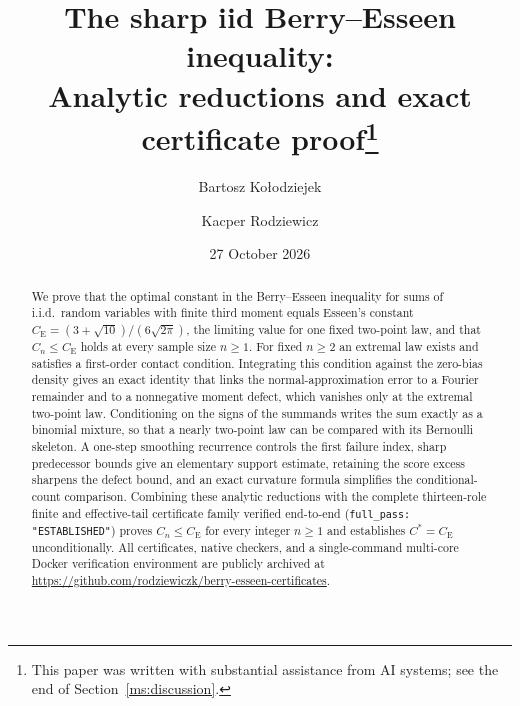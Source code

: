 \documentclass[11pt,a4paper]{article}
\title{The sharp iid Berry--Esseen inequality:\\
Analytic reductions and exact certificate proof\thanks{This paper was written with substantial
assistance from AI systems; see the end of Section~\ref{ms:discussion}.}}
\author{Bartosz Ko{\l}odziejek \and Kacper Rodziewicz}
\date{27 October 2026}
\theoremstyle{definition}
\theoremstyle{remark}
\newcommand{\CE}{C_{\mathrm E}}
\begin{document}
\maketitle
\begin{abstract}
We prove that the optimal constant in the Berry--Esseen inequality for sums
of i.i.d.\ random variables with finite third moment equals Esseen's constant
$\CE=(3+\sqrt{10})/(6\sqrt{2\pi})$, the limiting value for one fixed
two-point law, and that $C_n\le\CE$ holds at every sample size $n\ge1$.
For fixed $n\ge2$ an extremal law exists and satisfies a
first-order contact condition. Integrating this condition against the
zero-bias density gives an exact identity that links the
normal-approximation error to a Fourier remainder and to a nonnegative
moment defect, which vanishes only at the extremal two-point law.
Conditioning on the signs of the summands writes the sum exactly as a
binomial mixture, so that a nearly two-point law can be compared with its
Bernoulli skeleton. A one-step smoothing recurrence controls the first failure
index, sharp predecessor bounds give an elementary support estimate, retaining
the score excess sharpens the defect bound, and an exact curvature formula
simplifies the conditional-count comparison. Combining these analytic
reductions with the complete thirteen-role finite and effective-tail
certificate family verified end-to-end (\texttt{full\_pass: "ESTABLISHED"})
proves $C_n\le\CE$ for every integer $n\ge1$ and establishes $C^*=\CE$
unconditionally. All certificates, native checkers, and a single-command
multi-core Docker verification environment are publicly archived at
\url{https://github.com/rodziewiczk/berry-esseen-certificates}.
\end{abstract}
\clearpage
\begingroup\small
\tableofcontents
\endgroup
\clearpage













\appendix
\setcounter{secnumdepth}{4}






\begingroup
\small\raggedright
{}


\endgroup
\end{document}
